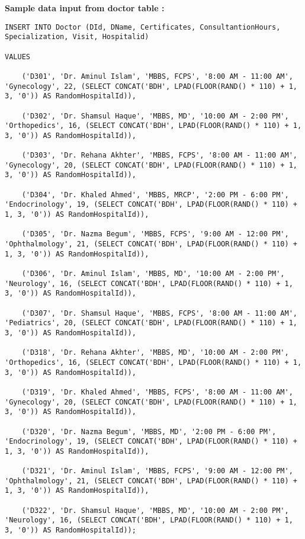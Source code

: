 \documentclass[11pt]{article}
\begin{document}
\newline
\newline
\textbf{Sample data input from doctor table :}
\begin{lstlisting}
INSERT INTO Doctor (DId, DName, Certificates, ConsultantionHours, Specialization, Visit, Hospitalid)

VALUES

    ('D301', 'Dr. Aminul Islam', 'MBBS, FCPS', '8:00 AM - 11:00 AM', 'Gynecology', 22, (SELECT CONCAT('BDH', LPAD(FLOOR(RAND() * 110) + 1, 3, '0')) AS RandomHospitalId)),
    
    ('D302', 'Dr. Shamsul Haque', 'MBBS, MD', '10:00 AM - 2:00 PM', 'Orthopedics', 16, (SELECT CONCAT('BDH', LPAD(FLOOR(RAND() * 110) + 1, 3, '0')) AS RandomHospitalId)),
    
    ('D303', 'Dr. Rehana Akhter', 'MBBS, FCPS', '8:00 AM - 11:00 AM', 'Gynecology', 20, (SELECT CONCAT('BDH', LPAD(FLOOR(RAND() * 110) + 1, 3, '0')) AS RandomHospitalId)),
    
    ('D304', 'Dr. Khaled Ahmed', 'MBBS, MRCP', '2:00 PM - 6:00 PM', 'Endocrinology', 19, (SELECT CONCAT('BDH', LPAD(FLOOR(RAND() * 110) + 1, 3, '0')) AS RandomHospitalId)),
    
    ('D305', 'Dr. Nazma Begum', 'MBBS, FCPS', '9:00 AM - 12:00 PM', 'Ophthalmology', 21, (SELECT CONCAT('BDH', LPAD(FLOOR(RAND() * 110) + 1, 3, '0')) AS RandomHospitalId)),
    
    ('D306', 'Dr. Aminul Islam', 'MBBS, MD', '10:00 AM - 2:00 PM', 'Neurology', 16, (SELECT CONCAT('BDH', LPAD(FLOOR(RAND() * 110) + 1, 3, '0')) AS RandomHospitalId)),
    
    ('D307', 'Dr. Shamsul Haque', 'MBBS, FCPS', '8:00 AM - 11:00 AM', 'Pediatrics', 20, (SELECT CONCAT('BDH', LPAD(FLOOR(RAND() * 110) + 1, 3, '0')) AS RandomHospitalId)),
    
    ('D318', 'Dr. Rehana Akhter', 'MBBS, MD', '10:00 AM - 2:00 PM', 'Orthopedics', 16, (SELECT CONCAT('BDH', LPAD(FLOOR(RAND() * 110) + 1, 3, '0')) AS RandomHospitalId)),
    
    ('D319', 'Dr. Khaled Ahmed', 'MBBS, FCPS', '8:00 AM - 11:00 AM', 'Gynecology', 20, (SELECT CONCAT('BDH', LPAD(FLOOR(RAND() * 110) + 1, 3, '0')) AS RandomHospitalId)),
    
    ('D320', 'Dr. Nazma Begum', 'MBBS, MD', '2:00 PM - 6:00 PM', 'Endocrinology', 19, (SELECT CONCAT('BDH', LPAD(FLOOR(RAND() * 110) + 1, 3, '0')) AS RandomHospitalId)),
    
    ('D321', 'Dr. Aminul Islam', 'MBBS, FCPS', '9:00 AM - 12:00 PM', 'Ophthalmology', 21, (SELECT CONCAT('BDH', LPAD(FLOOR(RAND() * 110) + 1, 3, '0')) AS RandomHospitalId)),
    
    ('D322', 'Dr. Shamsul Haque', 'MBBS, MD', '10:00 AM - 2:00 PM', 'Neurology', 16, (SELECT CONCAT('BDH', LPAD(FLOOR(RAND() * 110) + 1, 3, '0')) AS RandomHospitalId));
\end{lstlisting}
\newline
\newline
\newline
\end{document}
